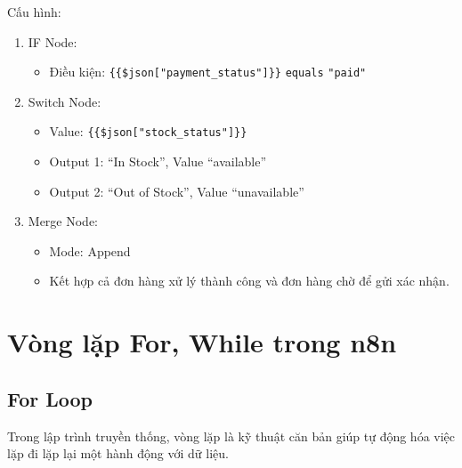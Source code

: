 
                                                           

Cấu hình:
\begin{enumerate}
  \item IF Node:
  \begin{itemize}
    \item Điều kiện: \texttt{\{\{\$json["payment\_status"]\}\}} \texttt{equals} \texttt{"paid"}
  \end{itemize}

  \item Switch Node:
  \begin{itemize}
    \item Value: \texttt{\{\{\$json["stock\_status"]\}\}}
    \item Output 1: ``In Stock'', Value ``available''
    \item Output 2: ``Out of Stock'', Value ``unavailable''
  \end{itemize}

  \item Merge Node:
  \begin{itemize}
    \item Mode: Append
    \item Kết hợp cả đơn hàng xử lý thành công và đơn hàng chờ để gửi xác nhận.
  \end{itemize}
\end{enumerate}

\section{Vòng lặp For, While trong n8n}

\subsection{For Loop}

Trong lập trình truyền thống, vòng lặp là kỹ thuật căn bản giúp tự động hóa việc lặp đi lặp lại một hành động với dữ liệu.


